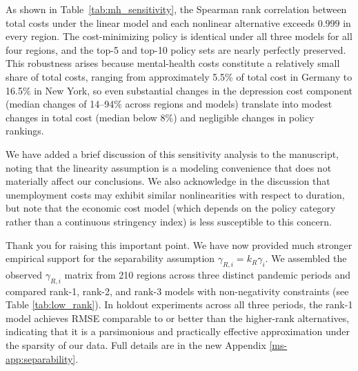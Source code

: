 \documentclass[letterpaper,twoside,11pt]{reviewresponse}
\begin{document}
As shown in Table~\ref{tab:mh_sensitivity}, the Spearman rank correlation between total costs under the linear model and each nonlinear alternative exceeds $0.999$ in every region. The cost-minimizing policy is identical under all three models for all four regions, and the top-5 and top-10 policy sets are nearly perfectly preserved. This robustness arises because mental-health costs constitute a relatively small share of total costs, ranging from approximately 5.5\% of total cost in Germany to 16.5\% in New York, so even substantial changes in the depression cost component (median changes of 14--94\% across regions and models) translate into modest changes in total cost (median below 8\%) and negligible changes in policy rankings.

We have added a brief discussion of this sensitivity analysis to the manuscript, noting that the linearity assumption is a modeling convenience that does not materially affect our conclusions. We also acknowledge in the discussion that unemployment costs may exhibit similar nonlinearities with respect to duration, but note that the economic cost model (which depends on the policy category rather than a continuous stringency index) is less susceptible to this concern.


Thank you for raising this important point. We have now provided much stronger empirical support for the separability assumption $\gamma_{R,i}=k_R\gamma_i$. We assembled the observed $\gamma_{R,i}$ matrix from 210 regions across three distinct pandemic periods and compared rank-1, rank-2, and rank-3 models with non-negativity constraints (see Table \ref{tab:low_rank}). In holdout experiments across all three periods, the rank-1 model achieves RMSE comparable to or better than the higher-rank alternatives, indicating that it is a parsimonious and practically effective approximation under the sparsity of our data. Full details are in the new Appendix \ref*{ms-app:separability}.

\end{document}
